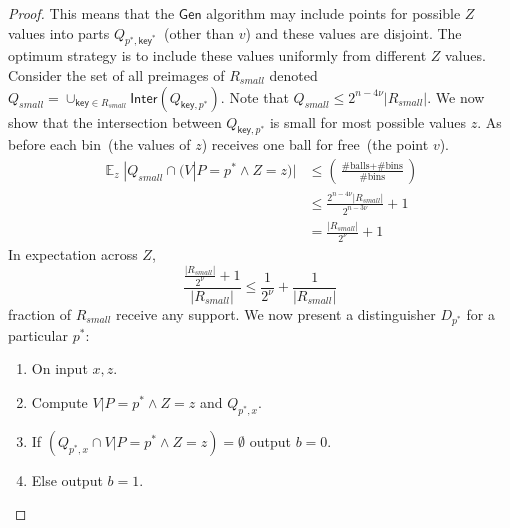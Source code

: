 \documentclass[11pt]{article}
\DeclareMathOperator*{\expe}{\mathbb{E}}
\newcommand{\class}[1]{{\ensuremath{\mathsf{#1}}}}
\newcommand{\key}{\ensuremath{\class{key}}\xspace}
\newcommand{\gen}{\ensuremath{\class{Gen}}\xspace}
\newcommand{\inter}{\ensuremath{\class{Inter}}\xspace}
\newcommand{\ngl}{\ensuremath{\mathtt{ngl}}\xspace}
\begin{document}
\begin{proof}
This means that the $\gen$ algorithm may include points for possible $Z$ values into parts $Q_{p^*, \key^*}$~(other than $v$) and these values are disjoint.  The optimum strategy is to include these values uniformly from different $Z$ values.  Consider the set of all preimages of $R_{small}$ denoted $Q_{small} = \cup_{\key\in R_{small}} \inter(Q_{\key, p^*})$.  Note that $Q_{small} \le 2^{n-4\nu}|R_{small}|$.  We now show that the intersection between $Q_{\key, p^*}$ is small for most possible values $z$.  As before each bin~(the values of $z$)  receives one ball for free~(the point $v$).
\begin{align*}
\expe_z |Q_{small} \cap (V | P=p^* \wedge Z=z) | &\le \left(\frac{\text{\# balls}+\text{\# bins}}{\text{\# bins}}\right)\\
&\le \frac{2^{n-4\nu}|R_{small}|}{2^{n - 3\nu}}+1\\
&=\frac{|R_{small}|}{2^{\nu}}+1
\end{align*}
In expectation across $Z$, 
\[\frac{\frac{|R_{small}|}{2^{\nu}}+1}{|R_{small}|} \le \frac{1}{2^\nu}+\frac{1}{|R_{small}|} \] fraction of $R_{small}$ receive any support.  %
We now present a distinguisher $D_{p^*}$ for a particular $p^*$:
\begin{enumerate}
\item On input $x, z$.
\item Compute $V|P=p^* \wedge Z=z$ and $Q_{p^*, x}$. 
\item If $(Q_{p^*, x} \cap V|P=p^* \wedge Z=z) =\emptyset$ output $b=0$.
\item Else output $b=1$.
\end{enumerate}


\end{proof}
\end{document}

